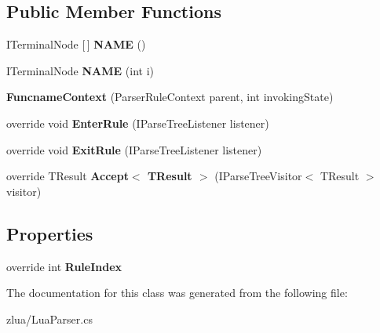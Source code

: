 \subsection*{Public Member Functions}
\begin{DoxyCompactItemize}
\item 
\mbox{\label{classzlua_1_1_lua_parser_1_1_funcname_context_a92257512d984b112ffc473fd8508b8e9}} 
I\+Terminal\+Node \mbox{[}$\,$\mbox{]} {\bfseries N\+A\+ME} ()
\item 
\mbox{\label{classzlua_1_1_lua_parser_1_1_funcname_context_aca55bf4ce61abdba4b2a30ba1b5b5ae5}} 
I\+Terminal\+Node {\bfseries N\+A\+ME} (int i)
\item 
\mbox{\label{classzlua_1_1_lua_parser_1_1_funcname_context_aa3e64bd20d2e1199df19481b98dcee54}} 
{\bfseries Funcname\+Context} (Parser\+Rule\+Context parent, int invoking\+State)
\item 
\mbox{\label{classzlua_1_1_lua_parser_1_1_funcname_context_a54fcf67e38b2d30afa22a30f7509d999}} 
override void {\bfseries Enter\+Rule} (I\+Parse\+Tree\+Listener listener)
\item 
\mbox{\label{classzlua_1_1_lua_parser_1_1_funcname_context_ace356b9f3c3fd7b1643e209208c42ab1}} 
override void {\bfseries Exit\+Rule} (I\+Parse\+Tree\+Listener listener)
\item 
\mbox{\label{classzlua_1_1_lua_parser_1_1_funcname_context_a0715ae0310d654c791bcaf0d008d0a86}} 
override T\+Result {\bfseries Accept$<$ T\+Result $>$} (I\+Parse\+Tree\+Visitor$<$ T\+Result $>$ visitor)
\end{DoxyCompactItemize}
\subsection*{Properties}
\begin{DoxyCompactItemize}
\item 
\mbox{\label{classzlua_1_1_lua_parser_1_1_funcname_context_a0220c16bf617c9a6994533dac6b26a6a}} 
override int {\bfseries Rule\+Index}
\end{DoxyCompactItemize}


The documentation for this class was generated from the following file\+:\begin{DoxyCompactItemize}
\item 
zlua/Lua\+Parser.\+cs\end{DoxyCompactItemize}
